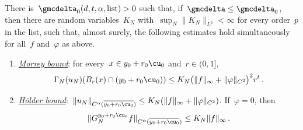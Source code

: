 \documentclass[11pt]{amsart}
\begin{document}
\begin{proposition}
\label{mfd:prop-growth}
There is~$\gmcdelta_0(d,t,\alpha,\text{list})>0$ such that, if~$\gmcdelta\leq\gmcdelta_0$, then there are random variables~$K_N$ with~$\sup_N\|K_N\|_{L^p}<\infty$ for every order~$p$ in the list, such that, almost surely, the following estimates hold simultaneously for all~$f$ and~$\varphi$ as above.
\begin{enumerate}[label=(\roman*)]
\item \underline{\emph{Morrey bound}}: for every~$x\in y_0+r_0\cu_0$ and~$r\in(0,1]$,
\begin{equation}
	\Gamma_N(u_N)(B_r(x)\cap(y_0+r_0\cu_0))\leq K_N\bigl(\|f\|_\infty+\|\varphi\|_{C^2}\bigr)^2r^t\,.
	\label{eq:mfd-4}
\end{equation}
\item \underline{\emph{H\"older bound}}:~$\|u_N\|_{C^\alpha(\overline{y_0+r_0\cu_0})}\leq K_N(\|f\|_\infty+\|\varphi\|_{C^2})$. If~$\varphi=0$, then
\begin{equation}
	\|G_N^{y_0+r_0\cu_0}f\|_{C^\alpha(\overline{y_0+r_0\cu_0})}\leq K_N\|f\|_\infty\,.
	\label{eq:mfd-5}
\end{equation}
\end{enumerate}
\end{proposition}
\end{document}
